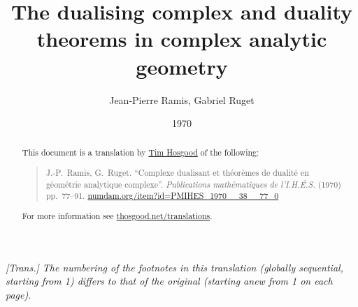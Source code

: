 \documentclass[british]{article}
\title{The dualising complex and duality theorems in complex analytic
geometry}
\author{Jean-Pierre Ramis, Gabriel Ruget}
\date{1970}
\begin{document}
\maketitle
\thispagestyle{fancy}

\setcounter{footnote}{0}

\begin{abstract}
  This document is a translation by \href{https://thosgood.net}{Tim Hosgood} of the following:
  \begin{quote}
    J.-P.~Ramis, G.~Ruget. ``Complexe dualisant et théorèmes de dualité
    en géométrie analytique complexe''. \emph{Publications mathématiques
    de l'I.H.É.S.} (1970) pp.~77--91.
    \href{http://www.numdam.org/item?id=PMIHES_1970__38__77_0}{numdam.org/item?id=PMIHES\_1970\_\_38\_\_77\_0}
  \end{quote}
  For more information see \href{https://thosgood.net/translations}{thosgood.net/translations}.
\end{abstract}

\tableofcontents
\bigskip


\providecommand{\scr}[1]{{\mathscr{#1}}}
\renewcommand{\cal}[1]{{\mathcal{#1}}}
\renewcommand{\frak}[1]{{\mathfrak{#1}}}
\renewcommand{\geq}{\geqslant}
\renewcommand{\leq}{\leqslant}

\newcommand{\sh}[1]{\scr{#1}}
\newcommand{\cat}[1]{\mathbf{#1}}

\newcommand{\OO}{\sh{O}}

\newcommand{\CC}{\mathrm{C}}
\newcommand{\HH}{\mathrm{H}}
\newcommand{\cc}{\mathrm{c}}
\newcommand{\FS}{\mathbf{FS}}
\newcommand{\DFS}{\mathbf{DFS}}
\newcommand{\QFS}{\mathbf{QFS}}
\newcommand{\QDFS}{\mathbf{QDFS}}
\newcommand{\KK}{\mathbf{K}}
\newcommand{\TT}{\mathbf{T}}
\newcommand{\II}{\mathbf{I}}
\renewcommand{\aa}{\mathrm{a}}
\newcommand{\DD}{\mathbf{D}}

\newcommand{\Hom}{\operatorname{Hom}}
\newcommand{\shHom}{\underline{\Hom}}
\newcommand{\RHom}{\operatorname{RHom}}
\newcommand{\Ext}{\operatorname{Ext}}
\newcommand{\shExt}{\underline{\Ext}}
\newcommand{\HyperExt}{\operatorname{HyperExt}}
\renewcommand{\Im}{\operatorname{Im}}
\newcommand{\Ker}{\operatorname{Ker}}
\newcommand{\Spec}{\operatorname{Spec}}
\newcommand{\dd}{\operatorname{d}}
\newcommand{\codim}{\operatorname{codim}}
\newcommand{\Ob}{\operatorname{Ob}}

\emph{{[}Trans.{]} The numbering of the footnotes in this translation
(globally sequential, starting from 1) differs to that of the original
(starting anew from 1 on each page)}. \bigskip
\end{document}
